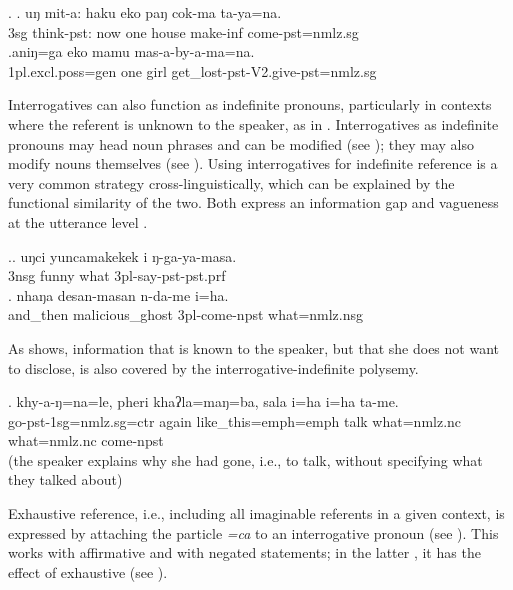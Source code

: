 \ex. \ag. uŋ mit-a:       haku eko paŋ  cok-ma    ta-ya=na.\\
		{\sc 3sg} think{\sc [3sg]-pst}: now one house{\sc } make-{\sc inf} come{\sc [3sg]-pst=nmlz.sg}	\\
	 
\bg.aniŋ=ga  eko mamu mas-a-by-a-ma=na.\\
{\sc 1pl.excl.poss=gen} one girl get\_lost{\sc [3sg]-pst-V2.give-pst=nmlz.sg}\\
	 


Interrogatives can also function as indefinite pronouns, particularly in contexts where the referent is unknown to the speaker, as in \Next. Interrogatives as indefinite pronouns may head noun phrases and can be modified (see \Next[a]); they may also modify nouns themselves (see \Next[b]). Using interrogatives for indefinite reference is a very common strategy cross-linguistically, which can be explained by the functional similarity of the two. Both express an information gap and vagueness at the utterance level \citep[170]{Haspelmath1997_Indefinite}. 

 \ex.\ag. uŋci yuncamakekek i ŋ-ga-ya-masa.\\
{\sc 3nsg} funny what {\sc 3pl-}say{\sc -pst-pst.prf}\\
  
 \bg. nhaŋa   desan-masan  n-da-me      i=ha.\\
 and\_then malicious\_ghost {\sc 3pl-}come{\sc -npst} what{\sc =nmlz.nsg}\\
  
 
 As \Next shows,  information that is known to the speaker, but that she does not want to disclose, is also covered by the interrogative-indefinite polysemy.
 
  \exg. khy-a-ŋ=na=le,    pheri khaʔla=maŋ=ba,        sala   i=ha   i=ha                ta-me.\\
 go{\sc -pst-1sg=nmlz.sg=ctr} again like\_this{\sc =emph=emph} talk what{\sc =nmlz.nc} what{\sc =nmlz.nc} come{\sc [3sg]-npst} \\
  (the speaker explains why she had gone, i.e., to talk, without specifying what they talked about) 
 
Exhaustive reference, i.e., including all imaginable referents in a given context, is expressed by attaching the  particle \emph{=ca} to an interrogative pronoun (see \Next). This works with affirmative and with negated statements; in the latter , it has the effect of exhaustive  (see \Next[c]).

